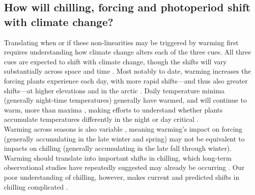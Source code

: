 \documentclass[11pt,letter]{article}
\begin{document}
\subsection{How will chilling, forcing and photoperiod shift with climate change?}
Translating when or if these non-linearities may be triggered by warming first requires understanding how climate change alters each of the three cues. All three cues are expected to shift with climate change, though the shifts will vary substantially across space and time \citep{Burrows2011pace}. Most notably to date, warming increases the forcing plants experience each day, with more rapid shifts---and thus also greater shifts---at higher elevations and in the arctic \citep{IPCC:2014sm}. Daily temperature minima (generally night-time temperatures) generally have warmed, and will continue to warm, more than maxima \citep[though this effect varies spatially,][]{Alexander:2006qy}, making efforts to understand whether plants accumulate temperatures differently in the night or day critical \citep{prasad2008,shen2018}. \\ 

Warming across seasons is also variable \citep{Alexander:2006qy}, meaning warming's impact on forcing (generally accumulating in the late winter and spring) may not be equivalent to impacts on chilling (generally accumulating in the late fall through winter). Warming should translate into important shifts in chilling, which long-term observational studies have repeatedly suggested may already be occurring \citep{fu2015,piao2017}.  Our poor understanding of chilling, however, makes current and predicted shifts in chilling complicated \citep{chuine2016}. \\
\end{document}
